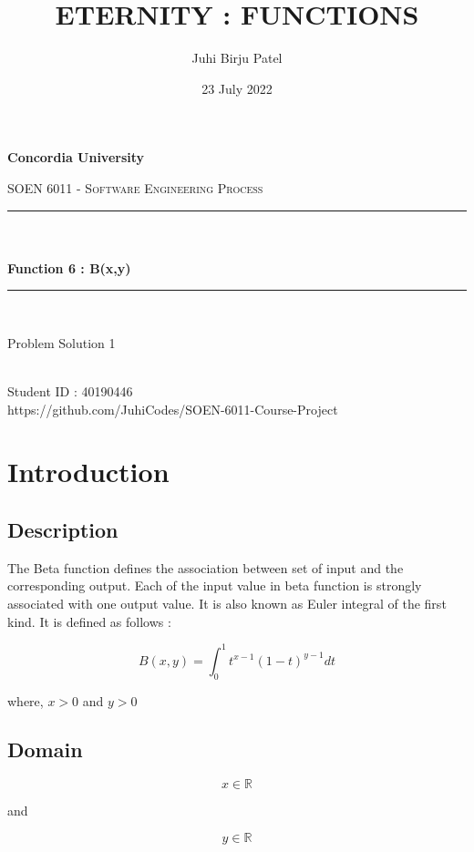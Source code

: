 \documentclass[12pt]{report}
\title{ETERNITY : FUNCTIONS}
\author{Juhi Birju Patel}
\date{23 July 2022}
\makeatletter
\newcommand{\R}{\mathbb{R}}
\let\thetitle\@title
\let\theauthor\@author
\makeatother
\begin{document}
\begin{titlepage}
	\centering
    \vspace*{0.5 cm}
\begin{center}    \textbf{\Large Concordia University}\\[2.0 cm]	\end{center}
	\textsc{\Large  SOEN 6011 - Software Engineering Process }\\[0.5 cm]
	\rule{\linewidth}{0.2 mm} \\[0.4 cm]
	{ \huge \textbf \thetitle}\\[0.2 cm]
	{ \huge \textbf{ Function 6 : B(x,y)}}
	\rule{\linewidth}{0.2 mm} \\[1.5 cm]

\begin{center}   {\Large Problem Solution 1}\\[2.0 cm]
\end{center}	
\begin{center}   {\Large \textbf{\theauthor}} \\[0.2 cm]
                 {\large Student ID : 40190446 }\\[0.2 cm]
                 {\large https://github.com/JuhiCodes/SOEN-6011-Course-Project}
\end{center}
	
\end{titlepage}

\tableofcontents
\pagebreak

\renewcommand{\thesection}{\arabic{section}}
\section{Introduction}
\subsection{Description}
The Beta function defines the association between set of input and the corresponding output. Each of the input value in beta function is strongly associated with one output value. It is also known as Euler integral of the first kind. It is defined as follows :

$$ B(x,y) = \int_{0}^{1} t^{x-1}(1-t)^{y-1}dt  $$ 

where, $ x > 0 $ and $ y > 0 $

\subsection{Domain}
  $$ x \in \R $$ 
  \begin{center}
   and   
  \end{center}
  $$ y \in \R $$
\end{document}

